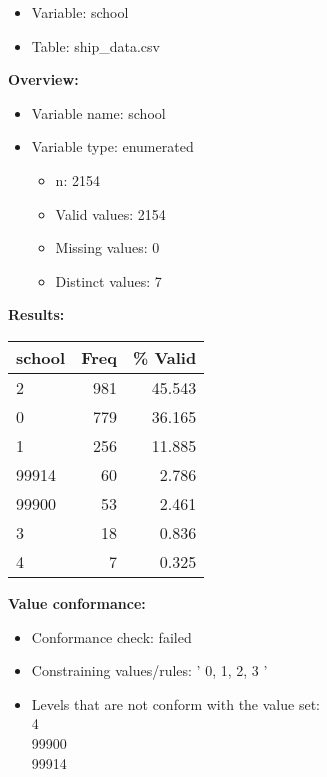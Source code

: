 \documentclass[
]{article}
\providecommand{\tightlist}{%
  \setlength{\itemsep}{0pt}\setlength{\parskip}{0pt}}
\begin{document}
\begin{itemize}
\tightlist
\item
  Variable: school
\item
  Table: ship\_data.csv
\end{itemize}

\textbf{Overview:}

\begin{itemize}
\tightlist
\item
  Variable name: school
\item
  Variable type: enumerated

  \begin{itemize}
  \tightlist
  \item
    n: 2154
  \item
    Valid values: 2154
  \item
    Missing values: 0
  \item
    Distinct values: 7
  \end{itemize}
\end{itemize}

\textbf{Results:}\\

\begin{table}[H]
\centering
\begin{tabular}{l|r|r}
\hline
\textbf{school} & \textbf{Freq} & \textbf{\% Valid}\\
\hline
2 & 981 & 45.543\\
\hline
0 & 779 & 36.165\\
\hline
1 & 256 & 11.885\\
\hline
99914 & 60 & 2.786\\
\hline
99900 & 53 & 2.461\\
\hline
3 & 18 & 0.836\\
\hline
4 & 7 & 0.325\\
\hline
\end{tabular}
\end{table}

\textbf{Value conformance:}

\begin{itemize}
\tightlist
\item
  Conformance check: failed
\item
  Constraining values/rules: ' 0, 1, 2, 3 '
\item
  Levels that are not conform with the value set:\\
  4\\
  99900\\
  99914
\end{itemize}
\end{document}
